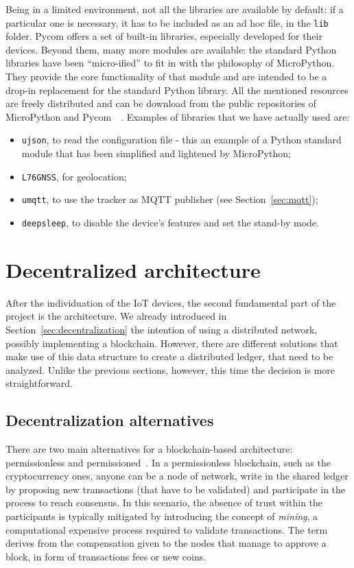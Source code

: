 Being in a limited environment, not all the libraries are available by default: if a particular one is necessary, it has to be included as an ad hoc file, in the \texttt{lib} folder. Pycom offers a set of built-in libraries, especially developed for their devices. Beyond them, many more modules are available: the standard Python libraries have been ``micro-ified'' to fit in with the philosophy of MicroPython. They provide the core functionality of that module and are intended to be a drop-in replacement for the standard Python library. All the mentioned resources are freely distributed and can be download from the public repositories of  MicroPython and Pycom~\cite{micropy_repo}~\cite{pycom_repo}. Examples of libraries that we have actually used are:
\begin{itemize}
    \item \texttt{ujson}, to read the configuration file - this an example of a Python standard module that has been simplified and lightened by MicroPython;
    \item \texttt{L76GNSS}, for geolocation;
    \item \texttt{umqtt}, to use the tracker as MQTT publisher (see Section~\ref{sec:mqtt});
    \item \texttt{deepsleep}, to disable the device's features and set the stand-by mode.
\end{itemize}

\chapter{Decentralized architecture}
\label{sec:arch}

After the individuation of the IoT devices, the second fundamental part of the project is the architecture. We already introduced in Section~\ref{sec:decentralization} the intention of using a distributed network, possibly implementing a blockchain. However, there are different solutions that make use of this data structure to create a distributed ledger, that need to be analyzed. Unlike the previous sections, however, this time the decision is more straightforward.

\section{Decentralization alternatives}
\label{sec:alternatives}
There are two main alternatives for a blockchain-based architecture: permissionless and permissioned~\cite{consensus_protocols}. In a permissionless blockchain, such as the cryptocurrency ones, anyone can be a node of network, write in the shared ledger by proposing new transactions (that have to be validated) and participate in the process to reach consensus. In this scenario, the absence of trust within the participants is typically mitigated by introducing the concept of \emph{mining}, a computational expensive process required to validate transactions. The term derives from the compensation given to the nodes that manage to approve a block, in form of transactions fees or new coins.

